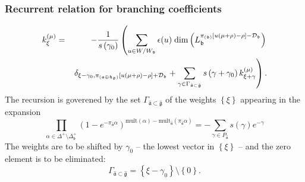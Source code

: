 \documentclass[pdftex]{beamer}
\newcommand{\gfh}{\hat{\mathfrak{g}}}
\newcommand{\afh}{\hat{\mathfrak{a}}}
\theoremstyle{definition} \newtheorem{Def}{Definition}
\begin{document}
\begin{frame}
\frametitle{Recurrent relation for branching coefficients}
\begin{eqnarray*}
k_{\xi }^{\left( \mu \right) } &=&-\frac{1}{s\left( \gamma _{0}\right) }%
\left( \sum_{u\in W/W_{\frak{b}}}\epsilon (u)\;\mathrm{dim}\left( L_{\mathfrak{b}}^{\pi
_{\left( \frak{b}\right) }\left[ u(\mu +\rho )-\rho \right] -\mathcal{D}_{%
\frak{b}}}\right) \right.\\
&&\left.\delta _{\xi -\gamma _{0},\pi _{\left( \frak{a\oplus h}%
_{\mathfrak{d}}\right) }\left[ u(\mu +\rho )-\rho \right] +\mathcal{D}_{\frak{b}%
}}+
\sum_{\gamma \in \Gamma _{\afh\subset \gfh}}s\left( \gamma
+\gamma _{0}\right) k_{\xi +\gamma }^{\left( \mu \right) }\right) \text{.}
\end{eqnarray*}
The recursion is goverened by the set $\Gamma _{\afh\subset \gfh}$ of the weights $\left\{\xi\right\}$
appearing in the expansion
\begin{equation*}
\prod_{\alpha \in \Delta ^{+}\setminus \Delta _{\mathfrak{b} }^{+}}\left( 1-e^{-\pi
_{\afh}\alpha }\right) ^{\mathrm{mult}(\alpha )-\mathrm{mult}_{\afh}(\pi _{\afh}\alpha )}=-\sum_{\gamma \in P_{\afh}}s(\gamma )e^{-\gamma }
\end{equation*}
The weights are to be shifted by $\gamma _{0}$ -- the lowest vector in $\left\{ \xi
\right\} $ -- and the zero element is to be eliminated:
\begin{equation*}
\Gamma _{\afh\subset \gfh}=\left\{ \xi -\gamma
_{0}\right\} \setminus \left\{ 0\right\} .
\end{equation*}
\end{frame}
\end{document}
